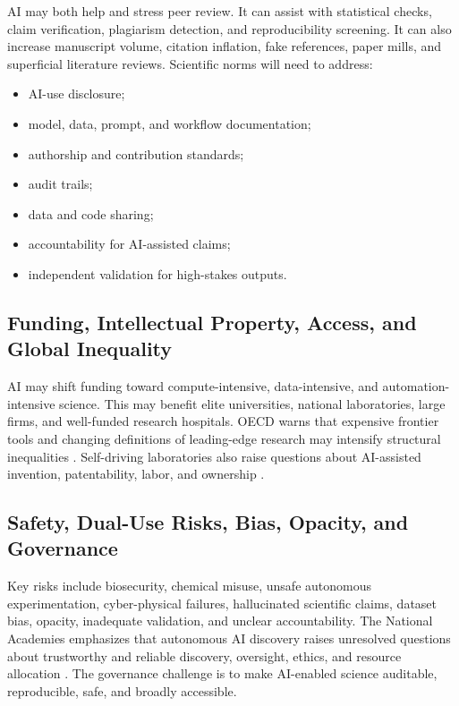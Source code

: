 \documentclass[12pt]{article}
\begin{document}
AI may both help and stress peer review. It can assist with statistical checks, claim verification, plagiarism detection, and reproducibility screening. It can also increase manuscript volume, citation inflation, fake references, paper mills, and superficial literature reviews. Scientific norms will need to address:
\begin{itemize}[leftmargin=*]
    \item AI-use disclosure;
    \item model, data, prompt, and workflow documentation;
    \item authorship and contribution standards;
    \item audit trails;
    \item data and code sharing;
    \item accountability for AI-assisted claims;
    \item independent validation for high-stakes outputs.
\end{itemize}

\subsection{Funding, Intellectual Property, Access, and Global Inequality}

AI may shift funding toward compute-intensive, data-intensive, and automation-intensive science. This may benefit elite universities, national laboratories, large firms, and well-funded research hospitals. OECD warns that expensive frontier tools and changing definitions of leading-edge research may intensify structural inequalities \cite{ref2}. Self-driving laboratories also raise questions about AI-assisted invention, patentability, labor, and ownership \cite{ref5}.

\subsection{Safety, Dual-Use Risks, Bias, Opacity, and Governance}

Key risks include biosecurity, chemical misuse, unsafe autonomous experimentation, cyber-physical failures, hallucinated scientific claims, dataset bias, opacity, inadequate validation, and unclear accountability. The National Academies emphasizes that autonomous AI discovery raises unresolved questions about trustworthy and reliable discovery, oversight, ethics, and resource allocation \cite{ref3}. The governance challenge is to make AI-enabled science auditable, reproducible, safe, and broadly accessible.
\end{document}
